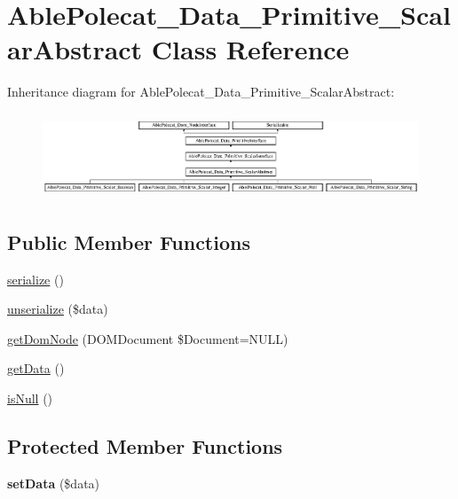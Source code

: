 \hypertarget{class_able_polecat___data___primitive___scalar_abstract}{}\section{Able\+Polecat\+\_\+\+Data\+\_\+\+Primitive\+\_\+\+Scalar\+Abstract Class Reference}
\label{class_able_polecat___data___primitive___scalar_abstract}
Inheritance diagram for Able\+Polecat\+\_\+\+Data\+\_\+\+Primitive\+\_\+\+Scalar\+Abstract\+:\begin{figure}[H]
\begin{center}
\leavevmode
\includegraphics[height=2.564103cm]{class_able_polecat___data___primitive___scalar_abstract}
\end{center}
\end{figure}
\subsection*{Public Member Functions}
\begin{DoxyCompactItemize}
\item 
\hyperlink{class_able_polecat___data___primitive___scalar_abstract_a4d9813fea8525b19a1d370eeb8fe41d6}{serialize} ()
\item 
\hyperlink{class_able_polecat___data___primitive___scalar_abstract_a91b3cb8a65e42152cacf1cf222bd26f6}{unserialize} (\$data)
\item 
\hyperlink{class_able_polecat___data___primitive___scalar_abstract_a3241c66cb1cbb7b720be191808876012}{get\+Dom\+Node} (D\+O\+M\+Document \$Document=N\+U\+L\+L)
\item 
\hyperlink{class_able_polecat___data___primitive___scalar_abstract_a81a67162a6288d78fc4c55283325f0b4}{get\+Data} ()
\item 
\hyperlink{class_able_polecat___data___primitive___scalar_abstract_a4af7cea238ab52f6e40a1eed86bdc1be}{is\+Null} ()
\end{DoxyCompactItemize}
\subsection*{Protected Member Functions}
\begin{DoxyCompactItemize}
\item 
\hypertarget{class_able_polecat___data___primitive___scalar_abstract_a5ae172026b770b4c669fe7478120591c}{}{\bfseries set\+Data} (\$data)\label{class_able_polecat___data___primitive___scalar_abstract_a5ae172026b770b4c669fe7478120591c}

\end{DoxyCompactItemize}
